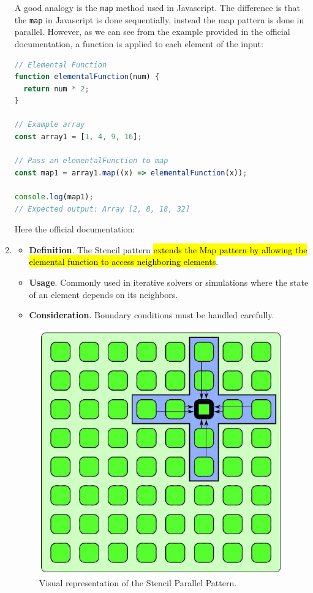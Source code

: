 \begin{enumerate}
    \begin{examplebox}
        A good analogy is the \texttt{map} method used in Javascript. The difference is that the \texttt{map} in Javascript is done sequentially, instead the map pattern is done in parallel. However, as we can see from the example provided in the official documentation, a function is applied to each element of the input:
        \begin{lstlisting}[language=JavaScript]
// Elemental Function
function elementalFunction(num) {
  return num * 2;
}

// Example array
const array1 = [1, 4, 9, 16];

// Pass an elementalFunction to map
const map1 = array1.map((x) => elementalFunction(x));

console.log(map1);
// Expected output: Array [2, 8, 18, 32]\end{lstlisting}
        Here the official documentation:
        \begin{center}
        \end{center}
    \end{examplebox}


    \item {}
    \begin{itemize}
        \item[\textcolor{Red2}{\faIcon{book}}] \textcolor{Red2}{\textbf{Definition}}. The Stencil pattern \hl{extends the Map pattern by allowing the elemental function to access neighboring elements}.

        \item[\textcolor{Green3}{\faIcon{tools}}] \textcolor{Green3}{\textbf{Usage}}. Commonly used in iterative solvers or simulations where the state of an element depends on its neighbors.

        \item[\textcolor{Green3}{\faIcon{question-circle}}] \textcolor{Green3}{\textbf{Consideration}}. Boundary conditions must be handled carefully.
    \end{itemize}
    \begin{figure}[!htp]
        \centering
        \includegraphics[width=.44\textwidth]{img/stencil-pattern-1.pdf}
        \caption{Visual representation of the Stencil Parallel Pattern.}
    \end{figure}



\end{enumerate}
